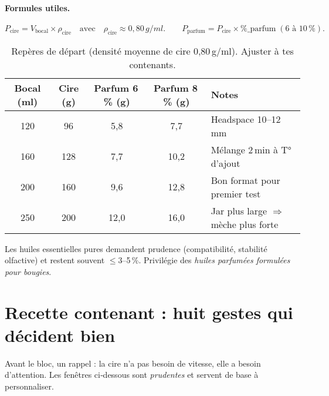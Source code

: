 \documentclass[../../main.tex]{subfiles}
\begin{document}
\paragraph{Formules utiles.}
\[
P_{\text{cire}} = V_{\text{bocal}}\times \rho_{\text{cire}}
\quad\text{avec}\quad
\rho_{\text{cire}} \approx 0{,}80\,\si{g/ml}.
\qquad
P_{\text{parfum}} = P_{\text{cire}}\times \%\_{\text{parfum}} \;(6\text{ à }10\,\%).
\]

\begin{table}[!h]
  \centering
  \small
  \setlength{\tabcolsep}{6pt}
  \renewcommand{\arraystretch}{1.2}
  \begin{tabularx}{\linewidth}{c c c c X}
    \toprule
    \rowcolor{lightgray!35}
    \textbf{Bocal (ml)} & \textbf{Cire (g)} & \textbf{Parfum 6\,\% (g)} & \textbf{Parfum 8\,\% (g)} & \textbf{Notes} \\
    \midrule
    120 & 96 & 5{,}8 & 7{,}7 & Headspace 10–12\,mm \\
    160 & 128 & 7{,}7 & 10{,}2 & Mélange 2\,min à T° d’ajout \\
    200 & 160 & 9{,}6 & 12{,}8 & Bon format pour premier test \\
    250 & 200 & 12{,}0 & 16{,}0 & Jar plus large \(\Rightarrow\) mèche plus forte \\
    \bottomrule
  \end{tabularx}
  \caption{Repères de départ (densité moyenne de cire 0{,}80\,g/ml). Ajuster à tes contenants.}
\end{table}

\begin{remark}
Les huiles essentielles pures demandent prudence (compatibilité, stabilité olfactive) et restent souvent \(\leq\)3--5\,\%. Privilégie des \textit{huiles parfumées formulées pour bougies}.
\end{remark}

\section{Recette contenant : huit gestes qui décident bien}

Avant le bloc, un rappel : la cire n’a pas besoin de vitesse, elle a besoin d’attention. Les fenêtres ci‑dessous sont \textit{prudentes} et servent de base à personnaliser.
\end{document}
